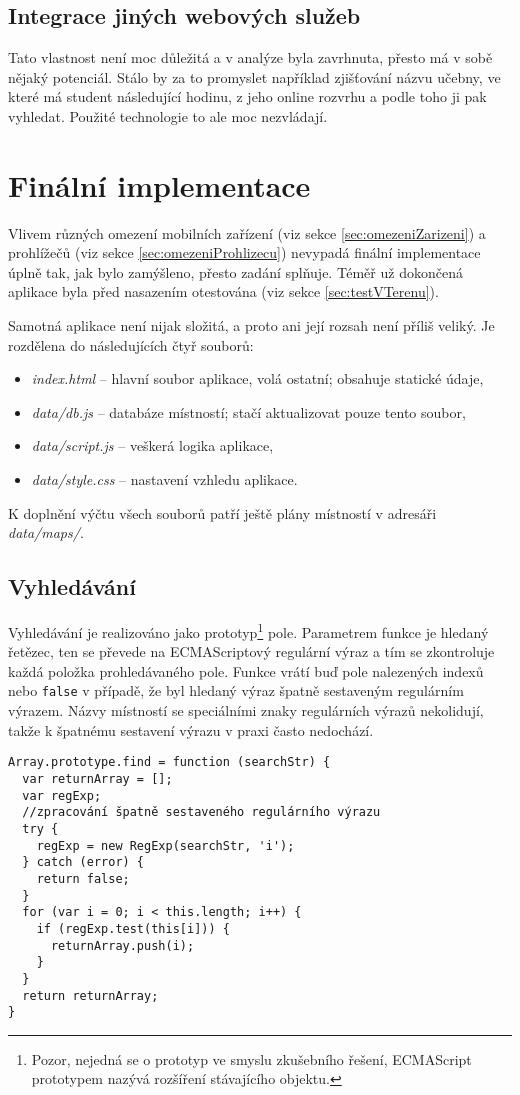 \subsection{Integrace jiných webových služeb}
Tato vlastnost není moc důležitá a v analýze byla zavrhnuta, přesto má v sobě nějaký potenciál. Stálo by za to promyslet například zjišťování názvu učebny, ve které má student následující hodinu, z jeho online rozvrhu a podle toho ji pak vyhledat. Použité technologie to ale moc nezvládají.



\section{Finální implementace}
Vlivem různých omezení mobilních zařízení (viz sekce \ref{sec:omezeniZarizeni}) a prohlížečů (viz sekce \ref{sec:omezeniProhlizecu}) nevypadá finální implementace úplně tak, jak bylo zamýšleno, přesto zadání splňuje. Téměř už dokončená aplikace byla před nasazením otestována (viz sekce \ref{sec:testVTerenu}).

Samotná aplikace není nijak složitá, a proto ani její rozsah není příliš veliký. Je rozdělena do následujících čtyř souborů:
\begin{itemize}
\item \emph{index.html} -- hlavní soubor aplikace, volá ostatní; obsahuje statické údaje,
\item \emph{data/db.js} -- databáze místností; stačí aktualizovat pouze tento soubor,
\item \emph{data/script.js} -- veškerá logika aplikace,
\item \emph{data/style.css} -- nastavení vzhledu aplikace.
\end{itemize}
K doplnění výčtu všech souborů patří ještě plány místností v adresáři \emph{data/maps/}.

\subsection{Vyhledávání}
Vyhledávání je realizováno jako prototyp\footnote{Pozor, nejedná se o prototyp ve smyslu zkušebního řešení, ECMAScript prototypem nazývá rozšíření stávajícího objektu.} pole. Parametrem funkce je hledaný řetězec, ten se převede na ECMAScriptový regulární výraz a tím se zkontroluje každá položka prohledávaného pole. Funkce vrátí buď pole nalezených indexů nebo \texttt{false} v případě, že byl hledaný výraz špatně sestaveným regulárním výrazem. Názvy místností se speciálními znaky regulárních výrazů nekolidují, takže k špatnému sestavení výrazu v praxi často nedochází.
\begin{verbatim}
Array.prototype.find = function (searchStr) {
  var returnArray = [];
  var regExp;
  //zpracování špatně sestaveného regulárního výrazu
  try {
    regExp = new RegExp(searchStr, 'i');
  } catch (error) {
    return false;
  }
  for (var i = 0; i < this.length; i++) {
    if (regExp.test(this[i])) {
      returnArray.push(i);
    }
  }
  return returnArray;
}
\end{verbatim}

